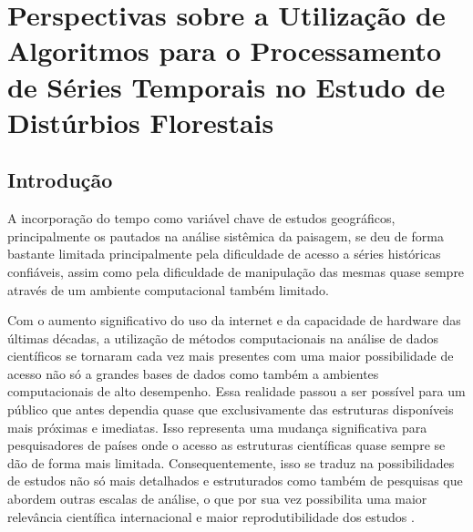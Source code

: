 \section{Perspectivas sobre a Utilização de Algoritmos para o Processamento de Séries Temporais no Estudo de Distúrbios Florestais}

\subsection{Introdução}

\hspace{13pt} A incorporação do tempo como variável chave de estudos geográficos, principalmente os pautados na análise sistêmica da paisagem, se deu de forma bastante limitada principalmente pela dificuldade de acesso a séries históricas confiáveis, assim como pela dificuldade de manipulação das mesmas quase sempre através de um ambiente computacional também limitado.

Com o aumento significativo do uso da internet e da capacidade de hardware das últimas décadas, a utilização de métodos computacionais na análise de dados científicos se tornaram cada vez mais presentes com uma maior possibilidade de acesso não só a grandes bases de dados como também a ambientes computacionais de alto desempenho. Essa realidade passou a ser possível para um público que antes dependia quase que exclusivamente das estruturas disponíveis mais próximas e imediatas. Isso representa uma mudança significativa para pesquisadores de países onde o acesso as estruturas científicas quase sempre se dão de forma mais limitada. Consequentemente, isso se traduz na possibilidades de estudos não só mais detalhados e estruturados como também de pesquisas que abordem outras escalas de análise, o que por sua vez possibilita uma maior relevância científica internacional e maior reprodutibilidade dos estudos \citep{ArribasBel2018}.

